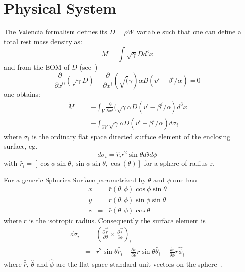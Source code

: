\section{Physical System}
The Valencia formalism defines its $D = \rho W$ variable such that one can define a 
total rest mass density as:
\begin{displaymath}
    M = \int \sqrt{\gamma} D d^3x
\end{displaymath}
and from the EOM of $D$ (see~\cite{lrr-font})
\begin{displaymath}
    \frac{\partial }{\partial x^0} (\sqrt{\gamma}D )+ 
    \frac{\partial }{\partial x^i} (\sqrt(\gamma) \alpha D (v^i- 
      \beta^i/\alpha) = 0
\end{displaymath}
one obtains:
\begin{eqnarray}
\dot M
&=& - \int_V \frac{\partial }{\partial x^i} 
   (\sqrt\gamma \alpha D(v^i - \beta^i/\alpha) d^3x \\
&=& -\int_{\partial V} \sqrt\gamma \alpha D (v^i-\beta^i/\alpha) d\sigma_i
\end{eqnarray}
where $\sigma_i$ is the ordinary flat space directed surface element of 
the enclosing surface, eg.\
\begin{displaymath}
d\sigma_i = \hat r_i r^2 \sin\theta d\theta d\phi
\end{displaymath}
with $\hat r_i = [\cos\phi\sin\theta, \sin\phi\sin\theta,
\cos(\theta)]$ 
for a sphere of radius r.

For a generic SphericalSurface parametrized by $\theta$ and $\phi$ one has:
\begin{eqnarray}
    x &=& \bar r(\theta, \phi) \cos\phi \sin\theta \\
    y &=& \bar r(\theta, \phi) \sin\phi \sin\theta \\
    z &=& \bar r(\theta, \phi)          \cos\theta
\end{eqnarray}
where $\bar r$ is the isotropic radius.
Consequently the surface element is
\begin{eqnarray}
    d \sigma_i 
    &=& \left( 
        \frac{\partial\vec{\bar r}}{\partial\theta} \times
        \frac{\partial\vec{\bar r}}{\partial\phi}
        \right)_i \\
    &=& \bar r^2 \sin\theta \hat{\bar r}_i 
        - \frac{\partial\bar r}{\partial\theta} \bar r \sin \theta \hat \theta_i
        - \frac{\partial\bar r}{\partial\phi} \bar r \hat \phi_i
\end{eqnarray}
where $\hat{\bar r}$, $\hat \theta$ and $\hat \phi$ are the flat space
standard unit vectors on the sphere~\cite{mtw:73}. 

